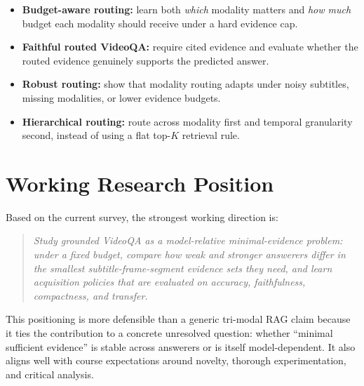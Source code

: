 \documentclass{article}
\begin{document}
\begin{itemize}
  \item \textbf{Budget-aware routing:} learn both \emph{which} modality matters and \emph{how much} budget each modality should receive under a hard evidence cap.
  \item \textbf{Faithful routed VideoQA:} require cited evidence and evaluate whether the routed evidence genuinely supports the predicted answer.
  \item \textbf{Robust routing:} show that modality routing adapts under noisy subtitles, missing modalities, or lower evidence budgets.
  \item \textbf{Hierarchical routing:} route across modality first and temporal granularity second, instead of using a flat top-$K$ retrieval rule.
\end{itemize}

\section{Working Research Position}
Based on the current survey, the strongest working direction is:
\begin{quote}
\emph{Study grounded VideoQA as a model-relative minimal-evidence problem: under a fixed budget, compare how weak and stronger answerers differ in the smallest subtitle-frame-segment evidence sets they need, and learn acquisition policies that are evaluated on accuracy, faithfulness, compactness, and transfer.}
\end{quote}

This positioning is more defensible than a generic tri-modal RAG claim because it ties the contribution to a concrete unresolved question: whether ``minimal sufficient evidence'' is stable across answerers or is itself model-dependent.
It also aligns well with course expectations around novelty, thorough experimentation, and critical analysis.
\end{document}
